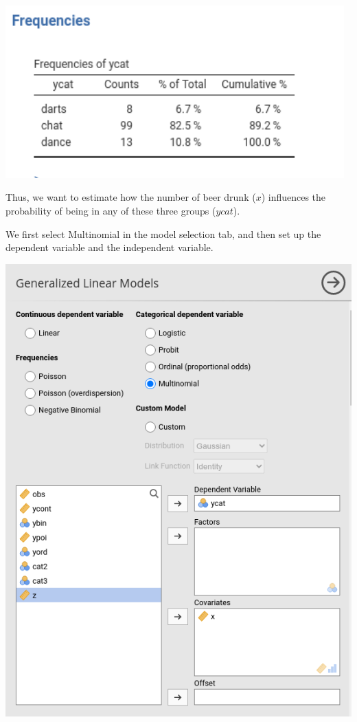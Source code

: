 \documentclass[
]{book}
\begin{document}
\includegraphics[width=5.14in]{bookletpics/3_multi_output1}

Thus, we want to estimate how the number of beer drunk (\(x\)) influences the probability of being in any of these three groups (\(ycat\)).

We first select {Multinomial} in the model selection tab, and then set up the dependent variable and the independent variable.

\includegraphics[width=8in]{bookletpics/3_multi_input1}
\end{document}
